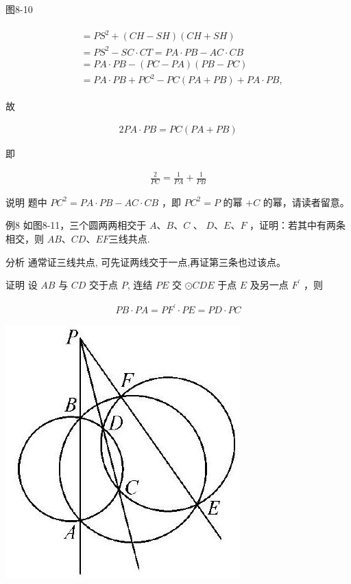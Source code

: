 \documentclass[10pt]{article}
\begin{document}
图8-10

\begin{align*}
\begin{aligned}
& =P S^{2}+(C H-S H)(C H+S H) \\
& =P S^{2}-S C \cdot C T=P A \cdot P B-A C \cdot C B \\
& =P A \cdot P B-(P C-P A)(P B-P C) \\
& =P A \cdot P B+P C^{2}-P C(P A+P B)+P A \cdot P B,
\end{aligned}
\end{align*}

故

\begin{align*}
2 P A \cdot P B=P C(P A+P B)
\end{align*}

即

\begin{align*}
\frac{2}{P C}=\frac{1}{P A}+\frac{1}{P B}
\end{align*}

说明 题中 $P C^{2}=P A \cdot P B-A C \cdot C B$ ，即 $P C^{2}=P$ 的幂 $+C$ 的幂，请读者留意。

例8 如图8-11，三个圆两两相交于 $A 、 B 、 C$ 、 $D 、 E 、 F$ ，证明：若其中有两条相交，则 $A B 、 C D 、 E F$三线共点.

分析 通常证三线共点, 可先证两线交于一点,再证第三条也过该点。

证明 设 $A B$ 与 $C D$ 交于点 $P$, 连结 $P E$ 交 $\odot C D E$ 于点 $E$ 及另一点 $F^{\prime}$ ，则

\begin{align*}
P B \cdot P A=P F^{\prime} \cdot P E=P D \cdot P C
\end{align*}

\begin{center}
\includegraphics[max width=\textwidth]{2024_10_30_66b8e5e701da2093c133g-062}
\end{center}
\end{document}
